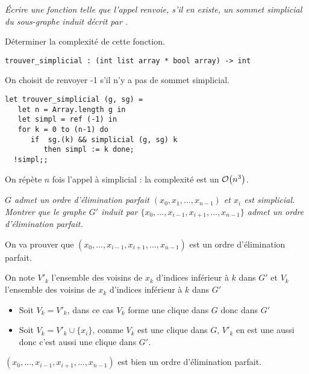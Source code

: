 \begin{Exercise}\it
Écrire une fonction  telle que l'appel  renvoie, s'il en existe, un sommet simplicial du sous-graphe induit décrit par . 

Déterminer la complexité de cette fonction.
\end{Exercise}  
\begin{lstlisting}
trouver_simplicial : (int list array * bool array) -> int
\end{lstlisting}
\begin{Answer}
On choisit de renvoyer -1 s'il n'y a pas de sommet simplicial.
\begin{lstlisting}
let trouver_simplicial (g, sg) =
   let n = Array.length g in
   let simpl = ref (-1) in
   for k = 0 to (n-1) do
      if  sg.(k) && simplicial (g, sg) k
         then simpl := k done;
  !simpl;;
\end{lstlisting} 
On répète $n$ fois l'appel à simplicial : la complexité est un ${\cal O}\bigl(n^3\bigr)$.
\end{Answer}
\begin{Exercise}\it
$G$ admet un ordre d'élimination parfait $(x_0, x_1, \ldots, x_{n-1})$ et  $x_i$ est simplicial. 
Montrer que le graphe $G'$ induit par $\{x_0, \ldots, x_{i-1}, x_{i+1}, \ldots, x_{n-1}\}$ admet un ordre d'élimination parfait.
\end{Exercise}  
\begin{Answer}
On va prouver que $(x_0, \ldots, x_{i-1}, x_{i+1}, \ldots, x_{n-1})$ est un ordre d'élimination parfait.

On note $V'_k$ l'ensemble des voisins de $x_k$ d'indices inférieur à $k$ dans $G'$ et $V_k$ l'ensemble des voisins de $x_k$ d'indices inférieur à $k$ dans $G'$
\begin{itemize}
    \item Soit $V_k = V'_k$, dans ce cas $V_k$ forme une clique dans $G$ donc dans $G'$
    \item Soit $V_k = V'_k\cup \{x_i\}$, comme $V_k$ est une clique dans $G$, $V'_k$ en est une aussi donc c'est aussi une clique dans $G'$.
\end{itemize}
$(x_0, \ldots, x_{i-1}, x_{i+1}, \ldots, x_{n-1})$ est bien un ordre d'élimination parfait.\end{Answer}
